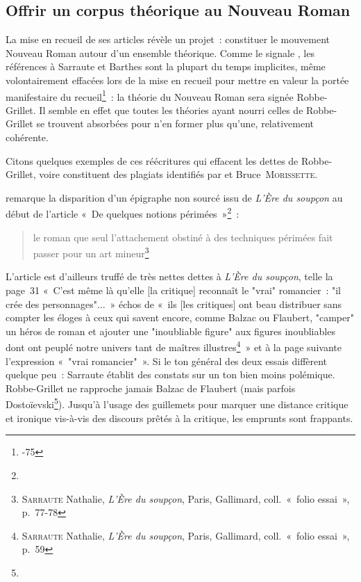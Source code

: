 \subsection{Offrir un corpus théorique au Nouveau Roman}

La mise en recueil de ses articles révèle un projet~: constituer le mouvement Nouveau Roman autour d'un ensemble théorique. Comme le signale \galia, les références à Sarraute et Barthes sont la plupart du temps implicites, même volontairement effacées lors de la mise en recueil pour mettre en valeur la portée manifestaire du recueil\footnote{-75}~: la théorie du Nouveau Roman sera signée Robbe-Grillet. Il semble en effet que toutes les théories ayant nourri celles de Robbe-Grillet se trouvent absorbées pour n'en former plus qu'une, relativement cohérente.

Citons quelques exemples de ces réécritures qui effacent les dettes de Robbe-Grillet, voire constituent des plagiats identifiés par \galia{} et Bruce~\textsc{Morissette}.



\galia{} remarque la disparition d'un épigraphe non sourcé issu de \textit{L'Ère du soupçon} au début de l'article «~De quelques notions périmées~»\footnote{}~:
\begin{quote}
    le roman que seul l'attachement obstiné à des techniques périmées fait passer pour un art mineur\footnote{\textsc{Sarraute} Nathalie, \textit{L'Ère du soupçon}, Paris, Gallimard, coll.~«~folio essai~», p.~77-78}
\end{quote}

L'article est d'ailleurs truffé de très nettes dettes à \textit{L'Ère du soupçon}, telle la page~31 «~C’est même là qu’elle [la critique] reconnaît le "vrai" romancier~: "il crée des personnages"...~» échos de «~ils [les critiques] ont beau distribuer sans compter les éloges à ceux qui savent encore, comme Balzac ou Flaubert, "camper" un héros de roman et ajouter une "inoubliable figure" aux figures inoubliables dont ont peuplé notre univers tant de maîtres illustres\footnote{\textsc{Sarraute} Nathalie, \textit{L'Ère du soupçon}, Paris, Gallimard, coll.~«~folio essai~», p.~59}~» et à la page suivante l'expression «~"vrai romancier"~». Si le ton général des deux essais diffèrent quelque peu~: Sarraute établit des constats sur un ton bien moins polémique. Robbe-Grillet ne rapproche jamais Balzac de Flaubert (mais parfois Dostoïevski\footnote{}). Jusqu'à l'usage des guillemets pour marquer une distance critique et ironique vis-à-vis des discours prêtés à la critique, les emprunts sont frappants. 

